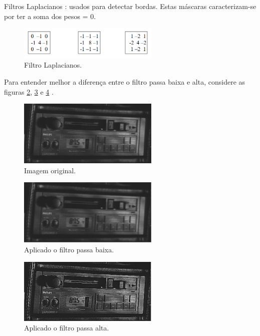 \documentclass{article}
\begin{document}
    Filtros Laplacianos : usados para detectar bordas. Estas máscaras caracterizam-se por ter a soma dos pesos = 0.
    
     \begin{figure}[H]
        \centering
        \includegraphics[width=0.6\textwidth]{template/img/fig9.png}
        \caption{Filtro Laplacianos.}
        \label{fig:fig9}
    \end{figure}
    
    Para entender melhor a diferença entre o filtro passa baixa e alta, considere as figuras \ref{fig:fig19}, \ref{fig:fig20} e \ref{fig:fig21} .
    
    \begin{figure}[H]
        \centering
        \includegraphics[width=0.6\textwidth]{template/img/fig19.png}
        \caption{Imagem original.}
        \label{fig:fig19}
    \end{figure}
    
    \begin{figure}[H]
        \centering
        \includegraphics[width=0.6\textwidth]{template/img/fig20.png}
        \caption{Aplicado o filtro passa baixa.}
        \label{fig:fig20}
    \end{figure}
    
    \begin{figure}[H]
        \centering
        \includegraphics[width=0.6\textwidth]{template/img/fig21.png}
        \caption{Aplicado o filtro passa alta.}
        \label{fig:fig21}
    \end{figure}
    
\end{document}
